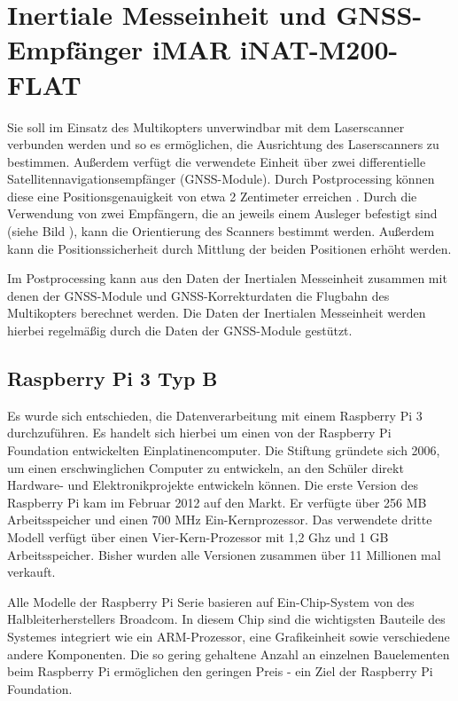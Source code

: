 \documentclass[a4paper,12pt,bibliography=totoc, listof=totoc,titlepage,pointlessnumbers]{scrreprt}
\begin{document}
\section{Inertiale Messeinheit und GNSS-Empfänger iMAR iNAT-M200-FLAT}
\label{s:iMar}
 Sie soll im Einsatz des Multikopters unverwindbar mit dem Laserscanner verbunden werden und so es ermöglichen, die Ausrichtung des Laserscanners zu bestimmen. Außerdem verfügt die verwendete Einheit über zwei differentielle Satellitennavigationsempfänger (GNSS-Module). Durch Postprocessing können diese eine Positionsgenauigkeit von etwa 2 Zentimeter erreichen \citep{imar}. Durch die Verwendung von zwei Empfängern, die an jeweils einem Ausleger befestigt sind (siehe Bild ), kann die Orientierung des Scanners bestimmt werden. Außerdem kann die Positionssicherheit durch Mittlung der beiden Positionen erhöht werden.

Im Postprocessing kann aus den Daten der Inertialen Messeinheit zusammen mit denen der GNSS-Module und GNSS-Korrekturdaten die Flugbahn des Multikopters berechnet werden. Die Daten der Inertialen Messeinheit werden hierbei regelmäßig durch die Daten der GNSS-Module gestützt.

\subsection{Raspberry Pi 3 Typ B}
\label{ss:Raspberry}
Es wurde sich entschieden, die Datenverarbeitung mit einem Raspberry Pi 3 durchzuführen. Es handelt sich hierbei um einen von der Raspberry Pi Foundation entwickelten Einplatinencomputer. Die Stiftung gründete sich 2006, um einen erschwinglichen Computer zu entwickeln, an den Schüler direkt Hardware- und Elektronikprojekte entwickeln können. Die erste Version des Raspberry Pi kam im Februar 2012 auf den Markt. Er verfügte über 256 MB Arbeitsspeicher und einen 700 MHz Ein-Kernprozessor. Das verwendete dritte Modell verfügt über einen Vier-Kern-Prozessor mit 1,2 Ghz und 1 GB Arbeitsspeicher. Bisher wurden alle Versionen zusammen über 11 Millionen mal verkauft. \citep{heise5Rasp}

Alle Modelle der Raspberry Pi Serie basieren auf Ein-Chip-System von des Halbleiterherstellers Broadcom. In diesem Chip sind die wichtigsten Bauteile des Systemes integriert wie ein ARM-Prozessor, eine Grafikeinheit sowie verschiedene andere Komponenten. Die so gering gehaltene Anzahl an einzelnen Bauelementen beim Raspberry Pi ermöglichen den geringen Preis - ein Ziel der Raspberry Pi Foundation.
\end{document}
